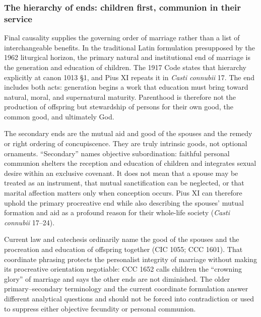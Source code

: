 \subsubsection{The hierarchy of ends: children first, communion in their service}

Final causality supplies the governing order of marriage rather than a list of interchangeable benefits. In the traditional Latin formulation presupposed by the 1962 liturgical horizon, the primary natural and institutional end of marriage is the generation and education of children. The 1917 Code states that hierarchy explicitly at canon 1013 \S1, and Pius XI repeats it in \emph{Casti connubii} 17. The end includes both acts: generation begins a work that education must bring toward natural, moral, and supernatural maturity. Parenthood is therefore not the production of offspring but stewardship of persons for their own good, the common good, and ultimately God.

The secondary ends are the mutual aid and good of the spouses and the remedy or right ordering of concupiscence. They are truly intrinsic goods, not optional ornaments. ``Secondary'' names objective subordination: faithful personal communion shelters the reception and education of children and integrates sexual desire within an exclusive covenant. It does not mean that a spouse may be treated as an instrument, that mutual sanctification can be neglected, or that marital affection matters only when conception occurs. Pius XI can therefore uphold the primary procreative end while also describing the spouses' mutual formation and aid as a profound reason for their whole-life society (\emph{Casti connubii} 17--24).

Current law and catechesis ordinarily name the good of the spouses and the procreation and education of offspring together (CIC 1055; CCC 1601). That coordinate phrasing protects the personalist integrity of marriage without making its procreative orientation negotiable: CCC 1652 calls children the ``crowning glory'' of marriage and says the other ends are not diminished. The older primary--secondary terminology and the current coordinate formulation answer different analytical questions and should not be forced into contradiction or used to suppress either objective fecundity or personal communion.


